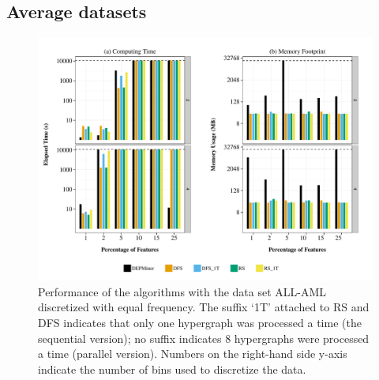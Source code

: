 \documentclass[12pt,a4paper]{article}
\begin{document}
\clearpage
\subsection*{Average datasets}

\begin{figure}[htb]
\begin{center}
\includegraphics[scale=0.65]{all_aml_ew}
\end{center}
\caption{Performance of the algorithms with the data set ALL-AML discretized with equal frequency.
The suffix `1T' attached to RS and DFS indicates that only one hypergraph was processed a time (the
sequential version); no suffix indicates 8 hypergraphs were processed a time (parallel version).
Numbers on the right-hand side y-axis indicate the number of bins used to discretize the data.}
\label{qcep:fig:allamlef}
\end{figure}
\end{document}
